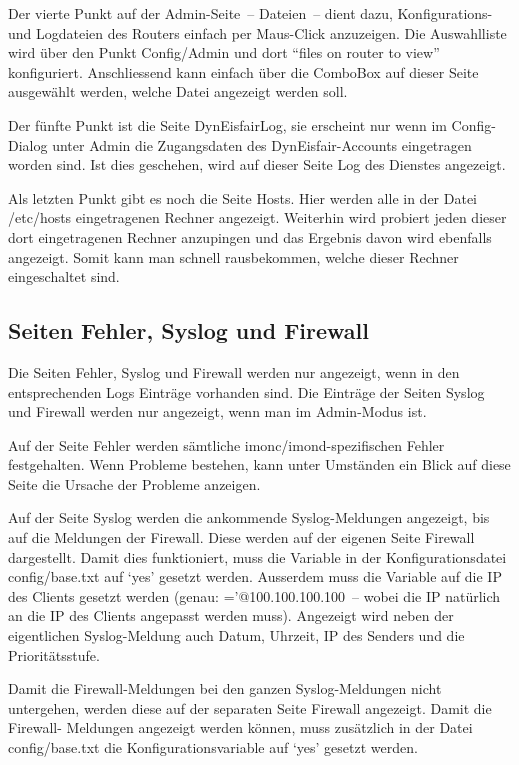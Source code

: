   Der vierte Punkt auf der Admin-Seite~-- Dateien~-- dient dazu,
  Konfigurations- und Logdateien des Routers einfach per Maus-Click
  anzuzeigen. Die Auswahlliste wird über den Punkt Config/Admin und
  dort ``files on router to view'' konfiguriert.  Anschliessend kann
  einfach über die ComboBox auf dieser Seite ausgewählt werden, welche
  Datei angezeigt werden soll.

  Der fünfte Punkt ist die Seite DynEisfairLog, sie erscheint nur wenn im 
  Config-Dialog unter Admin die Zugangsdaten des DynEisfair-Accounts eingetragen
  worden sind. Ist dies geschehen, wird auf dieser Seite Log des Dienstes 
  angezeigt.
  
  Als letzten Punkt gibt es noch die Seite Hosts. Hier werden alle in der Datei
  /etc/hosts eingetragenen Rechner angezeigt. Weiterhin wird probiert jeden 
  dieser dort eingetragenen Rechner anzupingen und das Ergebnis davon wird 
  ebenfalls angezeigt. Somit kann man schnell rausbekommen, welche dieser 
  Rechner eingeschaltet sind. 

  \subsection{Seiten Fehler, Syslog und Firewall}

  Die Seiten Fehler, Syslog und Firewall werden nur angezeigt, wenn in
  den entsprechenden Logs Einträge vorhanden sind. Die Einträge der
  Seiten Syslog und Firewall werden nur angezeigt, wenn man im
  Admin-Modus ist.

  Auf der Seite Fehler werden sämtliche imonc/imond-spezifischen Fehler
  festgehalten. Wenn Probleme bestehen, kann unter Umständen ein Blick
  auf diese Seite die Ursache der Probleme anzeigen.

  Auf der Seite Syslog werden die ankommende Syslog-Meldungen
  angezeigt, bis auf die Meldungen der Firewall. Diese werden auf der
  eigenen Seite Firewall dargestellt. Damit dies funktioniert, muss
  die Variable  in der Konfigurationsdatei config/base.txt
  auf `yes' gesetzt werden. Ausserdem muss die Variable 
  auf die IP des Clients gesetzt werden (genau:
  ='@100.100.100.100~-- wobei die IP natürlich an die IP
  des Clients angepasst werden muss).  Angezeigt wird neben der
  eigentlichen Syslog-Meldung auch Datum, Uhrzeit, IP des Senders und die
  Prioritätsstufe.

  Damit die Firewall-Meldungen bei den ganzen Syslog-Meldungen nicht
  untergehen, werden diese auf der separaten Seite Firewall angezeigt.
  Damit die Firewall- Meldungen angezeigt werden können, muss
  zusätzlich in der Datei config/base.txt die Konfigurationsvariable
   auf `yes' gesetzt werden.

